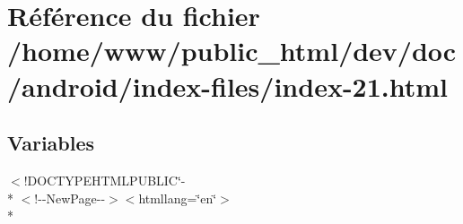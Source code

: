 \hypertarget{index-21_8html}{\section{Référence du fichier /home/www/public\-\_\-html/dev/doc/android/index-\/files/index-\/21.html}
\label{index-21_8html}
}
\subsection*{Variables}
\begin{DoxyCompactItemize}
\item 
$<$!D\-O\-C\-T\-Y\-P\-E\-H\-T\-M\-L\-P\-U\-B\-L\-I\-C\char`\"{}-\/\\*
$<$!-\/-\/New\-Page-\/-\/$>$$<$htmllang=\char`\"{}en\char`\"{}$>$\\*
$$
\end{DoxyCompactItemize}
